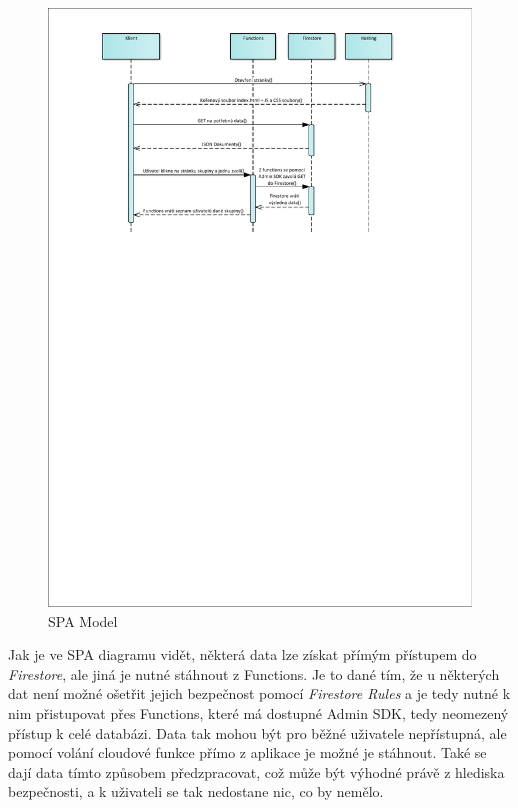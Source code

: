 \begin{figure}[H]
    \includegraphics[width=\textwidth]{pdf/SPA-model}
    \caption{SPA Model} \label{picture:recipeo:spa-model}
\end{figure}

Jak je ve SPA diagramu vidět, některá data lze získat přímým přístupem do \emph{Firestore}, ale jiná je nutné stáhnout z Functions.
Je to dané tím, že u některých dat není možné ošetřit jejich bezpečnost pomocí \emph{Firestore Rules} a je tedy nutné k nim přistupovat
přes Functions, které má dostupné Admin SDK, tedy neomezený přístup k celé databázi. Data tak mohou být pro běžné uživatele nepřístupná,
ale pomocí volání cloudové funkce přímo z aplikace je možné je stáhnout. Také se dají data tímto způsobem předzpracovat, což může
být výhodné právě z hlediska bezpečnosti, a k uživateli se tak nedostane nic, co by nemělo.

